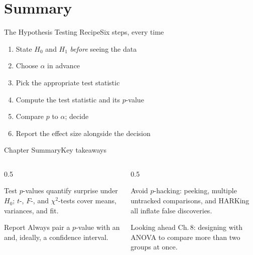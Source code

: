 \documentclass[aspectratio=169,11pt]{beamer}
\begin{document}
\section{Summary}

\begin{frame}{The Hypothesis Testing Recipe}{Six steps, every time}
  \begin{enumerate}\small
    \item State $H_0$ and $H_1$ \emph{before} seeing the data
    \item Choose $\alpha$ in advance
    \item Pick the appropriate test statistic
    \item Compute the test statistic and its $p$-value
    \item Compare $p$ to $\alpha$; decide
    \item Report the effect size alongside the decision
  \end{enumerate}
\end{frame}

\begin{frame}{Chapter Summary}{Key takeaways}
  \begin{columns}[T]
    \begin{column}{0.5\textwidth}
      \begin{block}{Test}
        \small $p$-values quantify surprise under $H_0$; $t$-, $F$-, and
        $\chi^2$-tests cover means, variances, and fit.
      \end{block}
      \begin{exampleblock}{Report}
        \small Always pair a $p$-value with an  and,
        ideally, a confidence interval.
      \end{exampleblock}
    \end{column}
    \begin{column}{0.5\textwidth}
      \begin{alertblock}{Avoid}
        \small $p$-hacking: peeking, multiple untracked comparisons, and
        HARKing all inflate false discoveries.
      \end{alertblock}
      \begin{block}{Looking ahead}
        \small Ch.\,8: designing  with ANOVA to
        compare more than two groups at once.
      \end{block}
    \end{column}
  \end{columns}
\end{frame}
\end{document}
